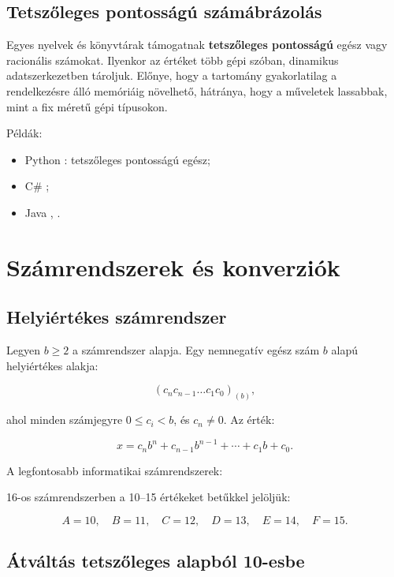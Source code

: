 \subsection{Tetszőleges pontosságú számábrázolás}

Egyes nyelvek és könyvtárak támogatnak \textbf{tetszőleges pontosságú} egész vagy racionális számokat. Ilyenkor az értéket több gépi szóban, dinamikus adatszerkezetben tároljuk. Előnye, hogy a tartomány gyakorlatilag a rendelkezésre álló memóriáig növelhető, hátránya, hogy a műveletek lassabbak, mint a fix méretű gépi típusokon.

Példák:

\begin{itemize}
  \item Python : tetszőleges pontosságú egész;
  \item C\# ;
  \item Java , .
\end{itemize}

\section{Számrendszerek és konverziók}

\subsection{Helyiértékes számrendszer}

Legyen $b\geq2$ a számrendszer alapja. Egy nemnegatív egész szám $b$ alapú helyiértékes alakja:

\[
(c_n c_{n-1}\ldots c_1c_0)_{(b)},
\]

ahol minden számjegyre $0\leq c_i<b$, és $c_n\neq0$. Az érték:

\[
x=c_n b^n+c_{n-1}b^{n-1}+\cdots+c_1b+c_0.
\]

A legfontosabb informatikai számrendszerek:

\begin{center}

\end{center}

16-os számrendszerben a 10--15 értékeket betűkkel jelöljük:

\[
A=10,\quad B=11,\quad C=12,\quad D=13,\quad E=14,\quad F=15.
\]

\subsection{Átváltás tetszőleges alapból 10-esbe}


